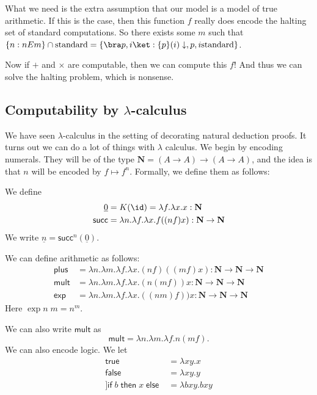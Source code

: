\documentclass[a4paper]{article}
\newcommand\plus{\mathsf{plus}}
\newcommand\mult{\mathsf{mult}}
\newcommand\lexp{\mathsf{exp}}
\renewcommand\succ{\mathsf{succ}}
\newcommand\cif{\mathsf{if}\;}
\newcommand\cthen{\;\mathsf{then}\;}
\newcommand\celse{\;\mathsf{else}\;}
\newcommand\ctrue{\mathsf{true}}
\newcommand\cfalse{\mathsf{false}}
\begin{document}
What we need is the extra assumption that our model is a model of true arithmetic. If this is the case, then this function $f$ really does encode the halting set of standard computations. So there exists some $m$ such that $\{n: n E m\} \cap \mathrm{standard} = \{\bra p, i\ket: \{p\}(i) \downarrow, p, i\text{standard}\}$.

Now if $+$ and $\times$ are computable, then we can compute this $f$! And thus we can solve the halting problem, which is nonsense.

\subsection{Computability by \texorpdfstring{$\lambda$}{lambda}-calculus}
We have seen $\lambda$-calculus in the setting of decorating natural deduction proofs. It turns out we can do a lot of things with $\lambda$ calculus. We begin by encoding numerals. They will be of the type $\mathbf{N} = (A \to A) \to (A \to A)$, and the idea is that $n$ will be encoded by $f \mapsto f^n$. Formally, we define them as follows:
\begin{defi}
  We define
  \begin{align*}
    \underline{0} &= K(\id) = \lambda f. \lambda x. x : \mathbf{N}\\
    \succ &= \lambda n. \lambda f. \lambda x. f((nf)x) : \mathbf{N} \to \mathbf{N}
  \end{align*}
  We write $\underline{n} = \succ^n(\underline{0})$.

  We can define arithmetic as follows:
  \begin{align*}
    \plus &= \lambda n. \lambda m. \lambda f. \lambda x. (nf)((mf)x): \mathbf{N} \to \mathbf{N} \to \mathbf{N}\\
    \mult &= \lambda n. \lambda m. \lambda f. \lambda x. (n(mf))x: \mathbf{N} \to \mathbf{N} \to \mathbf{N}\\
    \lexp &= \lambda n. \lambda m. \lambda f. \lambda x. ((nm)f))x: \mathbf{N} \to \mathbf{N} \to \mathbf{N}
  \end{align*}
  Here $\exp n\; m = n^m$.
\end{defi}
We can also write $\mult$ as
\[
  \mult = \lambda n. \lambda m.\lambda f. n(mf).
\]
We can also encode logic. We let
\begin{align*}
  \ctrue &= \lambda x y. x\\
  \cfalse &= \lambda xy. y\\]
  \cif b \cthen x \celse  &= \lambda b x y. b x y
\end{align*}
\end{document}
